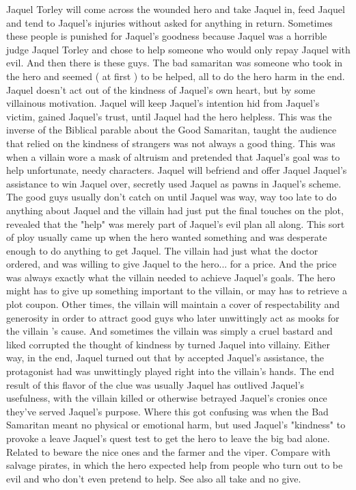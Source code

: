 \documentclass[12pt]{book}
\begin{document}
Jaquel Torley will come across the wounded hero and take Jaquel in, feed Jaquel and tend to Jaquel's injuries without asked for anything in return. Sometimes these people is punished for Jaquel's goodness because Jaquel was a horrible judge Jaquel Torley and chose to help someone who would only repay Jaquel with evil. And then there is these guys. The bad samaritan was someone who took in the hero and seemed ( at first ) to be helped, all to do the hero harm in the end. Jaquel doesn't act out of the kindness of Jaquel's own heart, but by some villainous motivation. Jaquel will keep Jaquel's intention hid from Jaquel's victim, gained Jaquel's trust, until Jaquel had the hero helpless. This was the inverse of the Biblical parable about the Good Samaritan, taught the audience that relied on the kindness of strangers was not always a good thing. This was when a villain wore a mask of altruism and pretended that Jaquel's goal was to help unfortunate, needy characters. Jaquel will befriend and offer Jaquel Jaquel's assistance to win Jaquel over, secretly used Jaquel as pawns in Jaquel's scheme. The good guys usually don't catch on until Jaquel was way, way too late to do anything about Jaquel and the villain had just put the final touches on the plot, revealed that the "help" was merely part of Jaquel's evil plan all along. This sort of ploy usually came up when the hero wanted something and was desperate enough to do anything to get Jaquel. The villain had just what the doctor ordered, and was willing to give Jaquel to the hero... for a price. And the price was always exactly what the villain needed to achieve Jaquel's goals. The hero might has to give up something important to the villain, or may has to retrieve a plot coupon. Other times, the villain will maintain a cover of respectability and generosity in order to attract good guys who later unwittingly act as mooks for the villain 's cause. And sometimes the villain was simply a cruel bastard and liked corrupted the thought of kindness by turned Jaquel into villainy. Either way, in the end, Jaquel turned out that by accepted Jaquel's assistance, the protagonist had was unwittingly played right into the villain's hands. The end result of this flavor of the clue was usually Jaquel has outlived Jaquel's usefulness, with the villain killed or otherwise betrayed Jaquel's cronies once they've served Jaquel's purpose. Where this got confusing was when the Bad Samaritan meant no physical or emotional harm, but used Jaquel's "kindness" to provoke a leave Jaquel's quest test to get the hero to leave the big bad alone. Related to beware the nice ones and the farmer and the viper. Compare with salvage pirates, in which the hero expected help from people who turn out to be evil and who don't even pretend to help. See also all take and no give.
\end{document}
